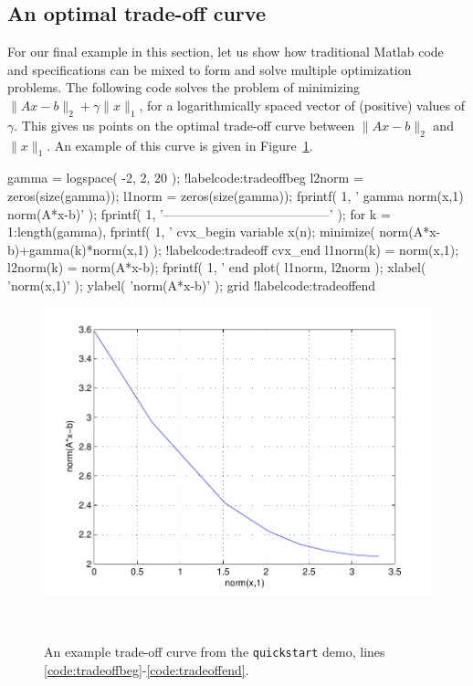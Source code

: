 \documentclass[12pt]{article}
\begin{document}
\subsection{An optimal trade-off curve}

For our final example in this section, let us show how traditional
Matlab code and \cvx specifications can be mixed to form and solve
multiple optimization problems. The following code solves the problem
of minimizing $\|Ax-b\|_2 +\gamma \|x\|_1$,
for a logarithmically spaced vector
of (positive) values of $\gamma$. This gives us points on the optimal
trade-off curve between $\|Ax-b\|_2$ and $\|x\|_1$. An example of this
curve is given in Figure~\ref{fig:tradeoff}.
\begin{code2}[firstnumber=270]
	gamma = logspace( -2, 2, 20 ); !label{code:tradeoffbeg}
	l2norm = zeros(size(gamma));
	l1norm = zeros(size(gamma));
	fprintf( 1, '   gamma       norm(x,1)    norm(A*x-b)\n' );
	fprintf( 1, '---------------------------------------\n' );
	for k = 1:length(gamma),
	    fprintf( 1, '%
	    cvx_begin
	        variable x(n);
	        minimize( norm(A*x-b)+gamma(k)*norm(x,1) );	!label{code:tradeoff}
	    cvx_end
	    l1norm(k) = norm(x,1);
	    l2norm(k) = norm(A*x-b);
	    fprintf( 1, '   %
	end
	plot( l1norm, l2norm );
	xlabel( 'norm(x,1)' );
	ylabel( 'norm(A*x-b)' );
	grid !label{code:tradeoffend}
\end{code2}
\begin{figure}
\begin{center}
\includegraphics[width=4.5in]{tradeoff}
\end{center}
~\\[-48pt]
\caption{An example trade-off curve from the \texttt{quickstart} demo, lines \ref{code:tradeoffbeg}-\ref{code:tradeoffend}.}
\label{fig:tradeoff}
\end{figure}
\end{document}
